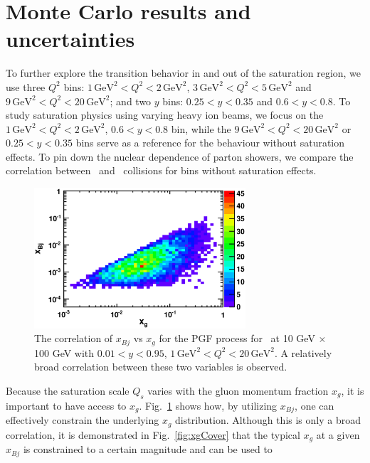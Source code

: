 \section{Monte Carlo results and uncertainties} 
 To further explore the
transition behavior in and out of the saturation region, we use three $Q^{2}$ bins:
$1\, \textrm{GeV}^{2}<Q^{2}<2 \, \mathrm{GeV}^{2}$, $3\, \textrm{GeV}^{2}<Q^{2}<5 \,
\mathrm{GeV}^{2}$ and $9\, \textrm{GeV}^{2}<Q^{2}<20 \, \mathrm{GeV}^{2}$; and two $y$ bins:
$0.25<y<0.35$ and $0.6<y<0.8$. To study saturation physics using varying heavy
ion beams, we focus on the $1\, \textrm{GeV}^{2}<Q^{2}<2 \, \mathrm{GeV}^{2}$, $0.6<y<0.8$
bin, while the $9\, \textrm{GeV}^{2}<Q^{2}<20 \, \mathrm{GeV}^{2}$ or $0.25<y<0.35$ bins serve
as a reference for the behaviour without saturation effects. To pin down the
nuclear dependence of parton showers, we compare the correlation between \ep\
and \eA\ collisions for bins without saturation effects.
\begin{figure}
\begin{center}
\includegraphics[width=0.7\textwidth]{plots/chpt6/xbjVsxg_highPtPairs_PGF_10x100.eps}
\end{center}
\caption[Correlation of $x_g$ and $x_{Bj}$]{The correlation of $x_{Bj}$ vs $x_{g}$ for the PGF process for \ep\ at 
10 GeV $\times$ 100 GeV with $0.01<y<0.95$, $1\, \textrm{GeV}^{2}<Q^{2}<20 \, \mathrm{GeV^{2}}$. A relatively 
broad correlation between these two variables is observed. }
\label{fig:xbjVsxg}
\end{figure}
Because the saturation scale $Q_{s}$ varies with the gluon momentum fraction
$x_{g}$, it is important to have access to $x_{g}$.
Fig.~\ref{fig:xbjVsxg} shows how, by utilizing $x_{Bj}$, one can
effectively constrain the underlying $x_{g}$ distribution. Although this is only
a broad correlation, it is demonstrated in Fig.~\ref{fig:xgCover} that
the typical $x_{g}$ at a given $x_{Bj}$ is constrained to a certain magnitude and can be used to
